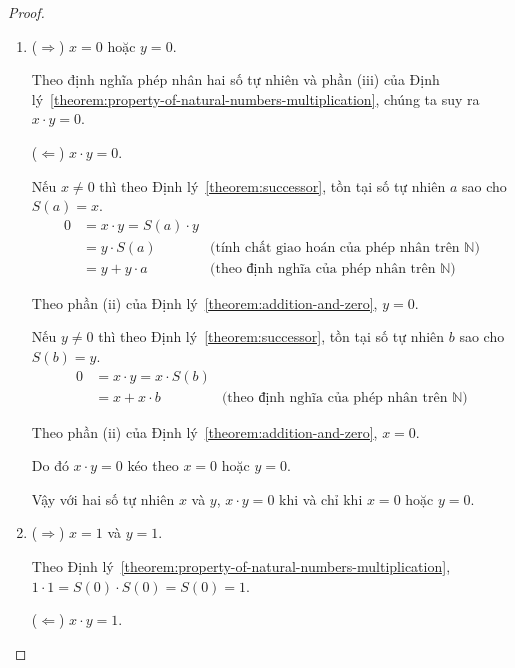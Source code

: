 \begin{proof}
    \begin{enumerate}[label={(\roman*)}]
        \item ($\Rightarrow$) $x = 0$ hoặc $y = 0$.

              Theo định nghĩa phép nhân hai số tự nhiên và phần (iii) của Định lý~\ref{theorem:property-of-natural-numbers-multiplication}, chúng ta suy ra $x\cdot y = 0$.

              ($\Leftarrow$) $x\cdot y = 0$.

              Nếu $x\ne 0$ thì theo Định lý~\ref{theorem:successor}, tồn tại số tự nhiên $a$ sao cho $S(a) = x$.
              \begin{align*}
                  0 & = x\cdot y = S(a)\cdot y                                                                \\
                    & = y\cdot S(a)            & \text{(tính chất giao hoán của phép nhân trên $\mathbb{N}$)} \\
                    & = y + y\cdot a           & \text{(theo định nghĩa của phép nhân trên $\mathbb{N}$)}
              \end{align*}

              Theo phần (ii) của Định lý~\ref{theorem:addition-and-zero}, $y = 0$.

              Nếu $y\ne 0$ thì theo Định lý~\ref{theorem:successor}, tồn tại số tự nhiên $b$ sao cho $S(b) = y$.
              \begin{align*}
                  0 & = x\cdot y = x\cdot S(b)                                                            \\
                    & = x + x\cdot b           & \text{(theo định nghĩa của phép nhân trên $\mathbb{N}$)}
              \end{align*}

              Theo phần (ii) của Định lý~\ref{theorem:addition-and-zero}, $x = 0$.

              Do đó $x\cdot y = 0$ kéo theo $x = 0$ hoặc $y = 0$.

              Vậy với hai số tự nhiên $x$ và $y$, $x\cdot y = 0$ khi và chỉ khi $x = 0$ hoặc $y = 0$.
        \item ($\Rightarrow$) $x = 1$ và $y = 1$.

              Theo Định lý~\ref{theorem:property-of-natural-numbers-multiplication}, $1\cdot 1 = S(0)\cdot S(0) = S(0) = 1$.

              ($\Leftarrow$) $x\cdot y = 1$.


\end{enumerate}
\end{proof}
